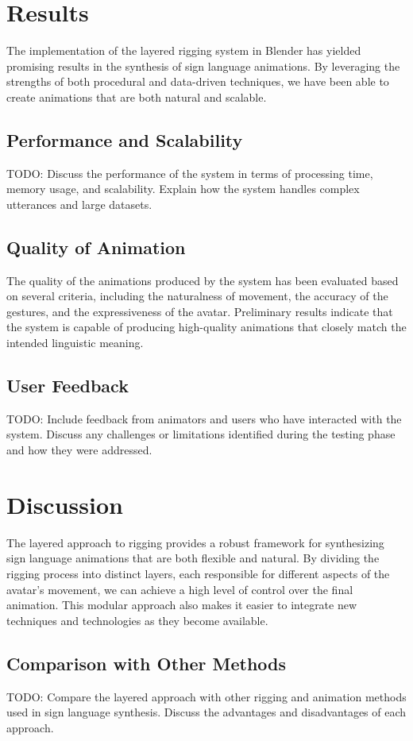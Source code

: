 \documentclass[../../main.tex]{subfiles}
\begin{document}
\section{Results}
The implementation of the layered rigging system in Blender has yielded promising results in the synthesis of sign language animations. By leveraging the strengths of both procedural and data-driven techniques, we have been able to create animations that are both natural and scalable.

\subsection{Performance and Scalability}
TODO: Discuss the performance of the system in terms of processing time, memory usage, and scalability. Explain how the system handles complex utterances and large datasets.

\subsection{Quality of Animation}
The quality of the animations produced by the system has been evaluated based on several criteria, including the naturalness of movement, the accuracy of the gestures, and the expressiveness of the avatar. Preliminary results indicate that the system is capable of producing high-quality animations that closely match the intended linguistic meaning.

\subsection{User Feedback}
TODO: Include feedback from animators and users who have interacted with the system. Discuss any challenges or limitations identified during the testing phase and how they were addressed.

\section{Discussion}
The layered approach to rigging provides a robust framework for synthesizing sign language animations that are both flexible and natural. By dividing the rigging process into distinct layers, each responsible for different aspects of the avatar's movement, we can achieve a high level of control over the final animation. This modular approach also makes it easier to integrate new techniques and technologies as they become available.

\subsection{Comparison with Other Methods}
TODO: Compare the layered approach with other rigging and animation methods used in sign language synthesis. Discuss the advantages and disadvantages of each approach.
\end{document}
